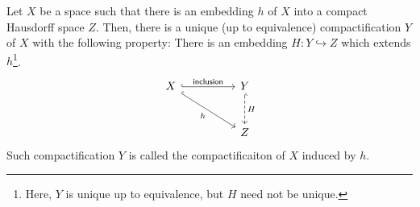 \begin{lem}\label{emb&cptf}
    Let $X$ be a space such that there is an embedding $h$ of $X$ into a compact Hausdorff space $Z$.
    Then, there is a unique (up to equivalence) compactification $Y$ of $X$ with the following property:
    There is an embedding $H: Y\hookrightarrow Z$ which extends $h$\footnote{Here, $Y$ is unique up to equivalence, but $H$ need not be unique.}.
    \begin{equation*}
        \begin{tikzcd}[row sep=large, column sep=huge]
            X \arrow[dr, "h"', hook] \arrow[r, "\textsf{inclusion}", hook] & Y \arrow[d, "H", hook, dashed] \\
            &Z
        \end{tikzcd}
    \end{equation*}
    Such compactification $Y$ is called the compactificaiton of $X$ induced by $h$.
\end{lem}
